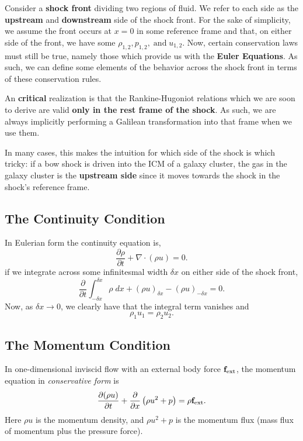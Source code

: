 Consider a \textbf{shock front} dividing two regions of fluid. We refer to each side as the \textbf{upstream} and \textbf{downstream} side of the shock front. For the sake of simplicity, we assume the front occurs at $x = 0$ in some reference frame and that, on either side of the front, we have some $\rho_{1,2},p_{1,2}, \;\text{and}\; u_{1,2}$. Now, certain conservation laws must still be true, namely those which provide us with the \textbf{Euler Equations}. As such, we can define some elements of the behavior across the shock front in terms of these conservation rules.
\begin{remark}
    An \textbf{critical} realization is that the Rankine-Hugoniot relations which we are soon to derive are  valid \textbf{only in the rest frame of the shock}. As such, we are always implicitly performing a Galilean transformation into that frame when we use them. 
    \par
    In many cases, this makes the intuition for which side of the shock is which tricky: if a bow shock is driven into the ICM of a galaxy cluster, the gas in the galaxy cluster is the \textbf{upstream side} since it moves towards the shock in the shock's reference frame. 
\end{remark}

\subsection*{The Continuity Condition}
In Eulerian form the continuity equation is,
\[
\frac{\partial \rho}{\partial t} + \nabla \cdot (\rho u) = 0.
\]
if we integrate across some infinitesmal width $\delta x$ on either side of the shock front,
\[
\frac{\partial}{\partial t} \int_{-\delta x}^{\delta x} \rho \;dx + (\rho u)_{\delta x} - (\rho u)_{-\delta x} =0.
\]
Now, as $\delta x \to 0$, we clearly have that the integral term vanishes and
\[
\boxed{\rho_1u_1 = \rho_2u_2}.
\]

\subsection*{The Momentum Condition}
In one-dimensional inviscid flow with an external body force ${\bf f}_{\rm ext}$, the momentum equation in \emph{conservative form} is
\begin{equation}
\frac{\partial (\rho u)}{\partial t} 
+ \frac{\partial}{\partial x} \left( \rho u^2 + p \right)
= \rho {\bf f}_{\rm ext}.
\end{equation}
Here $\rho u$ is the momentum density, and $\rho u^2 + p$ is the momentum flux (mass flux of momentum plus the pressure force).

